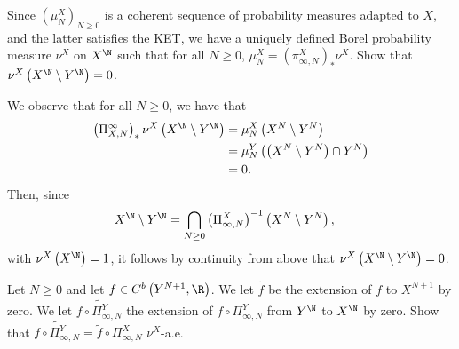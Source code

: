 \documentclass[10pt]{mypackage}
\begin{document}
\begin{problem}[Problem IV.14]
  Since $\left( \mu^X_{N} \right)_{N\geq 0}$ is a coherent sequence of probability measures adapted to $X$, and the latter satisfies the KET, we have a uniquely defined Borel probability measure $\nu^X$ on $X^{\N}$ such that for all $N\geq 0$, $\mu^X_N = \left( \pi^X_{\infty,N} \right)_{\ast}\nu^X$. Show that $\nu^X\left( X^{\N}\setminus Y^{\N} \right) = 0$.
\end{problem}
\begin{solution}
  We observe that for all $N\geq 0$, we have that
  \begin{align*}
    \left( \Pi^{\infty}_{X,N} \right)_{\ast}\nu^X\left( X^{\N}\setminus Y^{\N} \right) &= \mu^X_N\left( X^{N}\setminus Y^{N} \right)\\
                                                                                       &= \mu^Y_N\left( \left( X^N\setminus Y^N \right)\cap Y^N \right)\\
                                                                                        &= 0.
  \end{align*}
  Then, since
  \begin{align*}
    X^{\N}\setminus Y^{\N} &= \bigcap_{N\geq 0} \left( \Pi^{X}_{\infty,N} \right)^{-1}\left( X^{N}\setminus Y^{N} \right),
  \end{align*}
  with $\nu^X\left( X^{\N} \right) = 1$, it follows by continuity from above that $\nu^X\left( X^{\N}\setminus Y^{\N} \right) = 0$.
\end{solution}
\begin{problem}[Problem IV.15]
  Let $N\geq 0$ and let $f\in C^b\left( Y^{N+1},\R \right)$. We let $ \widetilde{f} $ be the extension of $f$ to $X^{N+1}$ by zero. We let $ \widetilde{f\circ \Pi^Y_{\infty,N}} $ the extension of $f\circ \Pi^Y_{\infty,N}$ from $Y^{\N}$ to $X^{\N}$ by zero. Show that $ \widetilde{f\circ \Pi^Y_{\infty,N}} = \widetilde{f}\circ \Pi^X_{\infty,N} $ $\nu^X$-a.e.
\end{problem}
\end{document}
